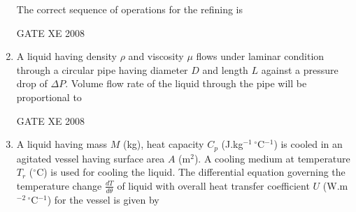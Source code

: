 \documentclass[12pt]{article}
\begin{document}
\begin{enumerate}[label=Q\arabic*.]
The correct sequence of operations for the refining is  

\begin{enumerate}[label=(\Alph*)]
\end{enumerate}

GATE XE 2008  

\item A liquid having density $\rho$ and viscosity $\mu$ flows under laminar condition through a circular pipe having diameter $D$ and length $L$ against a pressure drop of $\Delta P$. Volume flow rate of the liquid through the pipe will be proportional to  

\begin{enumerate}[label=(\Alph*)]
\end{enumerate}

GATE XE 2008  

\item  A liquid having mass $M$ (kg), heat capacity $C_p$ (J.kg$^{-1} \, ^\circ$C$^{-1}$) is cooled in an agitated vessel having surface area $A$ (m$^2$). A cooling medium at temperature $T_r$ ($^\circ$C) is used for cooling the liquid. The differential equation governing the temperature change $\frac{dT}{d\theta}$ of liquid with overall heat transfer coefficient $U$ (W.m$^{-2} \, ^\circ$C$^{-1}$) for the vessel is given by  

\begin{enumerate}[label=(\Alph*)]
\end{enumerate}


\end{enumerate}
\end{document}
